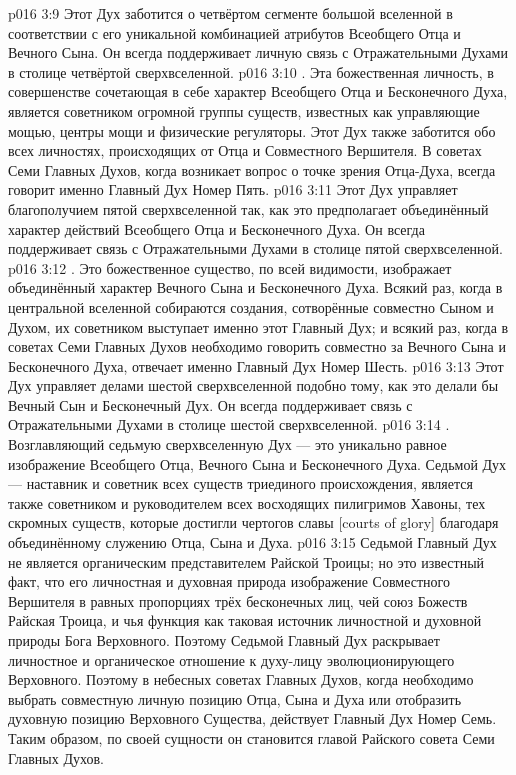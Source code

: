 \vs p016 3:9 Этот Дух заботится о четвёртом сегменте большой вселенной в соответствии с его уникальной комбинацией атрибутов Всеобщего Отца и Вечного Сына. Он всегда поддерживает личную связь с Отражательными Духами в столице четвёртой сверхвселенной.
\vs p016 3:10 \pc {}. Эта божественная личность, в совершенстве сочетающая в себе характер Всеобщего Отца и Бесконечного Духа, является советником огромной группы существ, известных как управляющие мощью, центры мощи и физические регуляторы. Этот Дух также заботится обо всех личностях, происходящих от Отца и Совместного Вершителя. В советах Семи Главных Духов, когда возникает вопрос о точке зрения Отца\hyp{}Духа, всегда говорит именно Главный Дух Номер Пять.
\vs p016 3:11 Этот Дух управляет благополучием пятой сверхвселенной так, как это предполагает объединённый характер действий Всеобщего Отца и Бесконечного Духа. Он всегда поддерживает связь с Отражательными Духами в столице пятой сверхвселенной.
\vs p016 3:12 \pc {}. Это божественное существо, по всей видимости, изображает объединённый характер Вечного Сына и Бесконечного Духа. Всякий раз, когда в центральной вселенной собираются создания, сотворённые совместно Сыном и Духом, их советником выступает именно этот Главный Дух; и всякий раз, когда в советах Семи Главных Духов необходимо говорить совместно за Вечного Сына и Бесконечного Духа, отвечает именно Главный Дух Номер Шесть.
\vs p016 3:13 Этот Дух управляет делами шестой сверхвселенной подобно тому, как это делали бы Вечный Сын и Бесконечный Дух. Он всегда поддерживает связь с Отражательными Духами в столице шестой сверхвселенной.
\vs p016 3:14 \pc {}. Возглавляющий седьмую сверхвселенную Дух --- это уникально равное изображение Всеобщего Отца, Вечного Сына и Бесконечного Духа. Седьмой Дух --- наставник и советник всех существ триединого происхождения, является также советником и руководителем всех восходящих пилигримов Хавоны, тех скромных существ, которые достигли чертогов славы [courts of glory] благодаря объединённому служению Отца, Сына и Духа.
\vs p016 3:15 Седьмой Главный Дух не является органическим представителем Райской Троицы; но это известный факт, что его личностная и духовная природа  изображение Совместного Вершителя в равных пропорциях трёх бесконечных лиц, чей союз Божеств  Райская Троица, и чья функция как таковая  источник личностной и духовной природы Бога Верховного. Поэтому Седьмой Главный Дух раскрывает личностное и органическое отношение к духу\hyp{}лицу эволюционирующего Верховного. Поэтому в небесных советах Главных Духов, когда необходимо выбрать совместную личную позицию Отца, Сына и Духа или отобразить духовную позицию Верховного Существа, действует Главный Дух Номер Семь. Таким образом, по своей сущности он становится главой Райского совета Семи Главных Духов.
